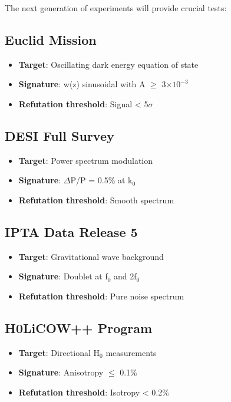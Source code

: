 \documentclass[
  11pt,
]{report}
\providecommand{\tightlist}{%
  \setlength{\itemsep}{0pt}\setlength{\parskip}{0pt}}
\begin{document}
The next generation of experiments will provide crucial tests:

\subsection{Euclid Mission}\label{euclid-mission}

\begin{itemize}
\tightlist
\item
  \textbf{Target}: Oscillating dark energy equation of state
\item
  \textbf{Signature}: w(z) sinusoidal with A \(\geq\)
  3\(\times 10^{-3}\)
\item
  \textbf{Refutation threshold}: Signal \textless{} 5\(\sigma\)
\end{itemize}

\subsection{DESI Full Survey}\label{desi-full-survey}

\begin{itemize}
\tightlist
\item
  \textbf{Target}: Power spectrum modulation
\item
  \textbf{Signature}: \(\Delta\)P/P = 0.5\% at k\(_0\)
\item
  \textbf{Refutation threshold}: Smooth spectrum
\end{itemize}

\subsection{IPTA Data Release 5}\label{ipta-data-release-5}

\begin{itemize}
\tightlist
\item
  \textbf{Target}: Gravitational wave background
\item
  \textbf{Signature}: Doublet at f\(_0\) and 2f\(_0\)
\item
  \textbf{Refutation threshold}: Pure noise spectrum
\end{itemize}

\subsection{H0LiCOW++ Program}\label{h0licow-program}

\begin{itemize}
\tightlist
\item
  \textbf{Target}: Directional H\(_0\) measurements
\item
  \textbf{Signature}: Anisotropy \(\leq\) 0.1\%
\item
  \textbf{Refutation threshold}: Isotropy \textless{} 0.2\%
\end{itemize}
\end{document}
